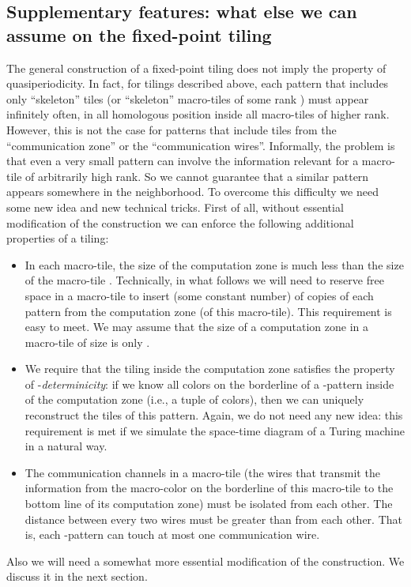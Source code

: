 \documentclass[runningheads]{llncs}
\begin{document}
 
 \subsection{Supplementary features: what else we can assume on the fixed-point tiling}
 
The general construction of a fixed-point tiling does not imply the property of quasiperiodicity. In fact, for tilings described above, each pattern that includes only ``skeleton'' tiles (or ``skeleton'' macro-tiles of some rank ) must appear infinitely often, in all homologous position inside all macro-tiles of higher rank. However, this is not the case for patterns that include tiles from the ``communication zone'' or the ``communication wires''. Informally, the problem is that  even a very small  pattern can involve the information relevant for a macro-tile of arbitrarily high rank. So we cannot guarantee that a similar pattern appears somewhere in the  neighborhood.  To overcome this difficulty we need some new idea and new technical tricks.
First of all, without essential modification of the construction we can enforce the following additional properties of a tiling:
\begin{itemize}
\item In each macro-tile, the size of the computation zone  is much less than the size of the macro-tile .  Technically, in what follows we will need to reserve free space in a macro-tile to insert  (some constant number) of copies of each  pattern  from the computation zone (of this macro-tile). This requirement is easy to meet.
We may  assume that the size of a computation zone in a macro-tile of size  is only . 
\item We require that the tiling inside the computation zone   satisfies the property of -\emph{determinicity}:  if we know all  colors  on the borderline of a -pattern inside of the computation zone (i.e., a tuple of  colors), then we can uniquely reconstruct the  tiles of this pattern. Again, we do not need any new idea: this requirement is met if we simulate the space-time diagram of a Turing machine in a natural way.
\item The communication channels in a macro-tile   (the wires that transmit the information from the macro-color on the borderline of this macro-tile to the bottom line of its computation zone) must be isolated from each other. The distance between every two wires must be greater than  from each other. That is, each -pattern   can touch at most one communication wire.
\end{itemize} 
Also we will need a somewhat more essential modification of the construction. We discuss it in the next section.
\end{document}
